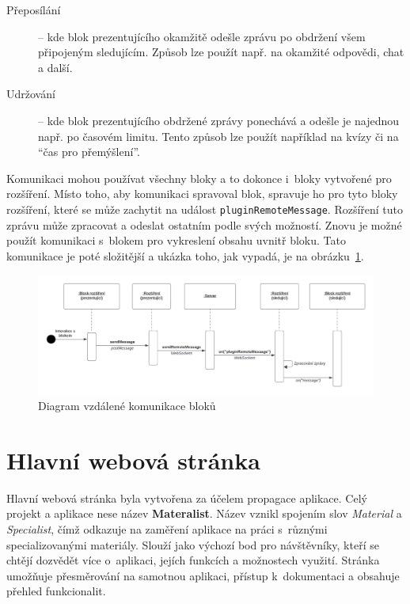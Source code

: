 \begin{description}
    \item[Přeposílání] -- kde blok prezentujícího okamžitě odešle zprávu po obdržení všem připojeným sledujícím. Způsob lze použít např. na okamžité odpovědi, chat a další.
    \item[Udržování] -- kde blok prezentujícího obdržené zprávy ponechává a odešle je najednou např. po časovém limitu. Tento způsob lze použít například na kvízy či na \enquote{čas pro přemýšlení}.
\end{description}

Komunikaci mohou používat všechny bloky a to dokonce i~bloky vytvořené pro rozšíření.
Místo toho, aby komunikaci spravoval blok, spravuje ho pro tyto bloky rozšíření, které se může zachytit na událost \verb|pluginRemoteMessage|.
Rozšíření tuto zprávu může zpracovat a odeslat ostatním podle svých možností. 
Znovu je možné použít komunikaci s~blokem pro vykreslení obsahu uvnitř bloku.
Tato komunikace je poté složitější a ukázka toho, jak vypadá, je na obrázku~\ref{fig:realizace/vzdalenaKomunikace}.

\begin{figure}[ht!]
    \centering
    \includegraphics[width=1\textwidth]{media/05_realizace/vzdalenaKomunikace.pdf}
    \caption{Diagram vzdálené komunikace bloků}\label{fig:realizace/vzdalenaKomunikace}
\end{figure}


\section{Hlavní webová stránka}\label{text:realizace/hlavniStranka}


Hlavní webová stránka byla vytvořena za účelem propagace aplikace.
Celý projekt a aplikace nese název \textbf{Materalist}.
Název vznikl spojením slov \textit{Material} a \textit{Specialist}, čímž odkazuje na zaměření aplikace na práci s~různými specializovanými materiály.
Slouží jako výchozí bod pro návštěvníky, kteří se chtějí dozvědět více o~aplikaci, jejích funkcích a možnostech využití. 
Stránka umožňuje přesměrování na samotnou aplikaci, přístup k~dokumentaci a obsahuje přehled funkcionalit.

